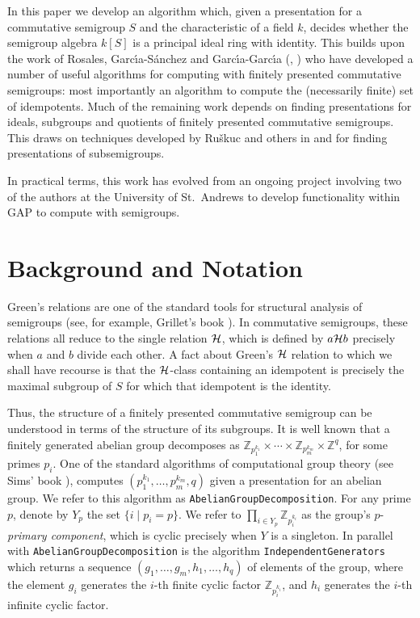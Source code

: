 \documentclass[12pt]{article}
\def\gap{\sf GAP}
\begin{document}
In this paper we develop an algorithm which, 
given a presentation for a commutative 
semigroup $S$ and the characteristic of a field $k$, 
decides whether the semigroup algebra $k[S]$ is a 
principal ideal ring with identity.
This builds upon the work of Rosales, Garc\'{\i}a-S\'{a}nchez and
Garc\'{\i}a-Garc\'{\i}a (\cite{pRGG99}, \cite{bRG99})
who have developed a number of useful algorithms for computing
with finitely presented commutative semigroups: most importantly
an algorithm to compute the (necessarily finite) set of idempotents.
Much of the remaining work depends on finding presentations
for ideals, subgroups and quotients of finitely presented 
commutative semigroups. This draws on techniques developed 
by Ru\v{s}kuc and others 
in \cite{CaRoRuTh:Reidmeister} and \cite{Ru99}
for finding presentations of subsemigroups.

In practical terms, this work has evolved from an 
ongoing project involving two of the authors
\cite{braga99} at the University of St.~Andrews to 
develop functionality within {\gap} \cite{gap} to compute with 
semigroups. 

\section{Background and Notation}

Green's relations are one of the  standard tools for 
structural analysis of semigroups (see, for example, Grillet's 
book \cite{Grillet:book}). In commutative semigroups, these 
relations all reduce to the single relation ${\cal H}$, which is 
defined by $a {\cal H} b$ precisely when $a$ and $b$ divide each 
other. A fact about Green's ${\cal H}$ relation to which we shall 
have recourse is that the ${\cal H}$-class containing an idempotent 
is precisely the maximal subgroup  of $S$ for which that idempotent 
is the identity.

Thus, the structure of a finitely presented commutative semigroup
can be understood in terms of the structure of its subgroups. 
It is well known that a finitely generated abelian group decomposes
as $\mathbb{Z}_{p_1^{k_1}} \times \cdots \times \mathbb{Z}_{p_m^{k_m}} 
\times \mathbb{Z}^q$, for some primes $p_i$.
One of the standard algorithms of computational
group theory (see Sims' book \cite{sims}), computes
$(p_1^{k_1}, \ldots, p_m^{k_m}, q)$ given a presentation for an 
abelian group. We refer to this algorithm as {\tt AbelianGroupDecomposition}.
For any prime $p$, denote by $Y_p$ the set $\{ i \mid p_i = p\}$. 
We refer to $\prod_{i \in Y_p}\mathbb{Z}_{p_i^{k_i}}$ as the  group's 
$p$-{\em primary component}, which is cyclic precisely when $Y$ 
is a singleton.  In parallel with {\tt AbelianGroupDecomposition}
is the algorithm {\tt IndependentGenerators} which returns a sequence
$(g_1, \ldots, g_m, h_1, \ldots, h_q)$ of elements of the group,
where the element $g_i$ generates the $i$-th finite 
cyclic factor $\mathbb{Z}_{p_i^{k_i}}$, and $h_i$ generates 
the $i$-th infinite cyclic factor.
\end{document}
